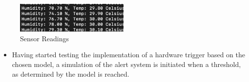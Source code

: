 \documentclass[12pt]{article}
\begin{document}
\begin{itemize}
		\begin{figure}[H]
			\centering
			\includegraphics[width=0.5\textwidth]{Images/Test/WhatsApp Image 2024-11-11 at 19.50.57_53e5664d.jpg}
			\caption{Sensor Readings}
		\end{figure}
		
		\begin{itemize}
			\item Having started testing the implementation of a hardware trigger based on the chosen model, a simulation of the alert system is initiated when a threshold, as determined by the model is reached. \\
			
			\begin{minipage}[H]{0.45\textwidth}
				\begin{figure}[H]
					

\end{figure}
\end{minipage}
\end{itemize}
\end{itemize}
\end{document}

